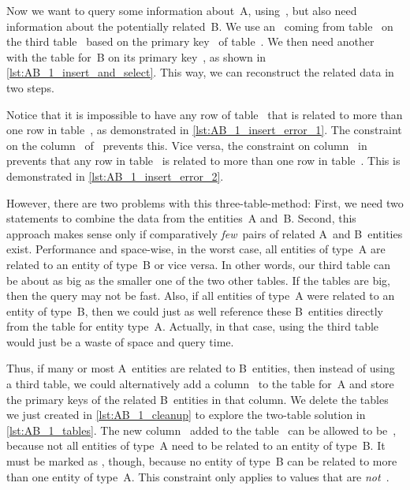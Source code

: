 Now we want to query some information about~A, using~, but also need information about the potentially related~B.
We use an~ coming from table~ on the third table~ based on the primary key~ of table~.
We then need another~ with the table for~B on its primary key~, as shown in \cref{lst:AB_1_insert_and_select}.
This way, we can reconstruct the related data in two steps.

Notice that it is impossible to have any row of table~ that is related to more than one row in table~, as demonstrated in \cref{lst:AB_1_insert_error_1}.
The  constraint on the column~ of~ prevents this.
Vice versa, the  constraint on column~ in~ prevents that any row in table~ is related to more than one row in table~.
This is demonstrated in \cref{lst:AB_1_insert_error_2}.

However, there are two problems with this three-table-method:
First, we need two  statements to combine the data from the entities~A and~B.
Second, this approach makes sense only if comparatively \emph{few}~pairs of related A~and B~entities exist.
Performance and space-wise, in the worst case, all entities of type~A are related to an entity of type~B or vice versa.
In other words, our third table can be about as big as the smaller one of the two other tables.
If the tables are big, then the query may not be fast.
Also, if all entities of type~A were related to an entity of type~B, then we could just as well reference these B~entities directly from the table for entity type~A.
Actually, in that case, using the third table would just be a waste of space and query time.

Thus, if many or most A~entities are related to B~entities, then instead of using a third table, we could alternatively add a column~ to the table for~A and store the primary keys of the related B~entities in that column.
We delete the tables we just created in \cref{lst:AB_1_cleanup} to explore the two-table solution in \cref{lst:AB_1_tables}.
The new column~ added to the table~ can be allowed to be~, because not all entities of type~A need to be related to an entity of type~B.
It must be marked as , though, because no entity of type~B can be related to more than one entity of type~A.
This constraint only applies to values that are \emph{not}~.

